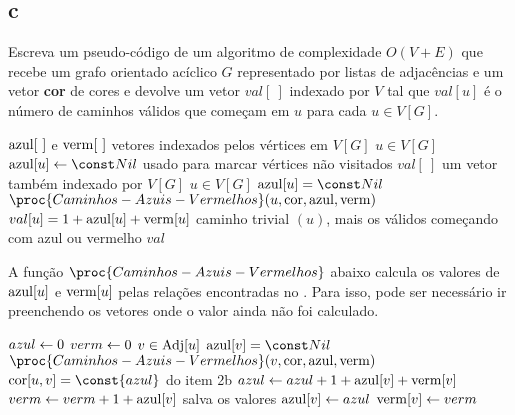 \subsection{c} Escreva um pseudo-código de um algoritmo de complexidade $O(V +E)$ que recebe um grafo orientado acíclico $G$ representado por listas de adjacências e um vetor \textbf{cor} de cores e devolve um vetor $val[~]$ indexado por $V$ tal que $val[u]$ é o número de caminhos válidos que começam em $u$ para cada $u \in V[G]$.

\itemdsep[0.25]


\newcommand{\Azul}{\const{azul}\xspace}
\newcommand{\Vermelho}{\const{vermelho}\xspace}

\begin{codebox}
\li \Sejam $\mathrm{azul}[~]$ e $\mathrm{verm}[~]$ vetores indexados pelos vértices em $V[G]$
\li \Para $u \in V[G]$ \Faca        \label{linha:2c:init}
    \Do
\li     $\azul[u] \Recebe \Nulo$    \label{linha:2c:init:end}
        \>\>\>\>\>\Comment usado para marcar vértices não visitados
    \End
\li
\li \Seja $val[~]$ um vetor também indexado por $V[G]$
\li \Para $u \in V[G]$ \Faca        \label{linha:2c:preenche}
    \Do
\li     \Se $\azul[u] = \Nulo$ \Entao
        \Do
\li         $\proc{Caminhos-Azuis-Vermelhos}(u, \cor, \azul, \verm)$    \label{linha:2c:preenche:chamada}
        \End
\li
\li     $val[u] = 1 + \mathrm{azul}[u] + \mathrm{verm}[u]$  \label{linha:2c:preenche:end}
\li     \Comment caminho trivial $(u)$, mais os válidos começando com azul ou vermelho
    \End
\li \Retorna $val$
\end{codebox}

A função $\proc{Caminhos-Azuis-Vermelhos}$ abaixo calcula os valores de $\mathrm{azul}[u]$ e $\mathrm{verm}[u]$ pelas relações encontradas no . Para isso, pode ser necessário ir preenchendo os vetores onde o valor ainda não foi calculado.

\begin{codebox}
\li $azul \leftarrow 0$
\li $verm \leftarrow 0$
\li \Para $v \in \operatorname{Adj}[u]$ \Faca \label{linha:2c:calc}
    \Do
\li     \Se $\azul[v] = \Nulo$ \Entao
        \Do
\li         $\proc{Caminhos-Azuis-Vermelhos}(v, \cor, \azul, \verm)$    \label{linha:2c:calc:chamada}
        \End
\li
\li     \Se $\cor[u,v] = \Azul$
        \>\>\>\>\>\>\>\Comment do item 2b
        \Do
\li         \Entao $azul \leftarrow azul + 1 + \mathrm{azul}[v] + \mathrm{verm}[v]$
\li         \Senao $verm \leftarrow verm + 1 + \mathrm{azul}[v]$ \label{linha:2c:calc:end}
        \End
    \End
\li
\li \Comment salva os valores
\li $\mathrm{azul}[v] \leftarrow azul$
\li $\mathrm{verm}[v] \leftarrow verm$
\end{codebox}
